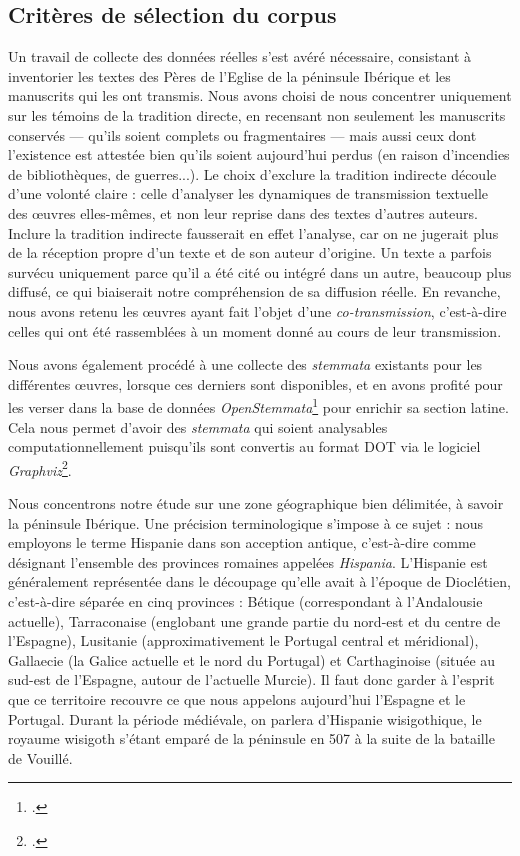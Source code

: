 \documentclass[a4paper,twoside,12pt]{book}
\begin{document}
\subsection{Critères de sélection du corpus}
\label{Critères de sélection du corpus}
Un travail de collecte des données réelles s’est avéré nécessaire, consistant à inventorier les textes des Pères de l'Eglise de la péninsule Ibérique et les manuscrits qui les ont transmis.  Nous avons choisi de nous concentrer uniquement sur les témoins de la tradition directe, en recensant non seulement les manuscrits conservés — qu’ils soient complets ou fragmentaires — mais aussi ceux dont l’existence est attestée bien qu’ils soient aujourd’hui perdus (en raison d’incendies de bibliothèques, de guerres...).
Le choix d’exclure la tradition indirecte découle d’une volonté claire : celle d’analyser les dynamiques de transmission textuelle des œuvres elles-mêmes, et non leur reprise dans des textes d’autres auteurs. Inclure la tradition indirecte fausserait en effet l’analyse, car on ne jugerait plus de la réception propre d'un texte et de son auteur d’origine. Un texte a parfois survécu uniquement parce qu’il a été cité ou intégré dans un autre, beaucoup plus diffusé, ce qui biaiserait notre compréhension de sa diffusion réelle. En revanche, nous avons retenu les œuvres ayant fait l’objet d’une \textit{co-transmission}, c’est-à-dire celles qui ont été rassemblées à un moment donné au cours de leur transmission. 

Nous avons également procédé  à une collecte des \textit{stemmata} existants pour les différentes œuvres, lorsque ces derniers sont disponibles, et en avons profité pour les verser dans la base de données \textit{OpenStemmata}\footcite{openstemmata} pour enrichir sa section latine. Cela nous permet d'avoir des \textit{stemmata} qui soient analysables computationnellement puisqu'ils sont convertis au format DOT via le logiciel \textit{Graphviz}\footcite{graphviz}.

Nous concentrons notre étude sur une zone géographique bien délimitée, à savoir la péninsule Ibérique. Une précision terminologique s’impose à ce sujet : nous employons le terme Hispanie dans son acception antique, c’est-à-dire comme désignant l’ensemble des provinces romaines appelées \textit{Hispania}. L'Hispanie est généralement représentée  dans le découpage qu'elle avait à l'époque de Dioclétien, c'est-à-dire séparée en cinq provinces : Bétique (correspondant à l’Andalousie actuelle), Tarraconaise (englobant une grande partie du nord-est et du centre de l’Espagne), Lusitanie (approximativement le Portugal central et méridional), Gallaecie (la Galice actuelle et le nord du Portugal) et Carthaginoise (située au sud-est de l’Espagne, autour de l’actuelle Murcie). Il faut donc garder à l’esprit que ce territoire recouvre ce que nous appelons aujourd’hui l’Espagne et le Portugal. Durant la période médiévale, on parlera d’Hispanie wisigothique, le royaume wisigoth s’étant emparé de la péninsule en 507 à la suite de la bataille de Vouillé.
\end{document}
